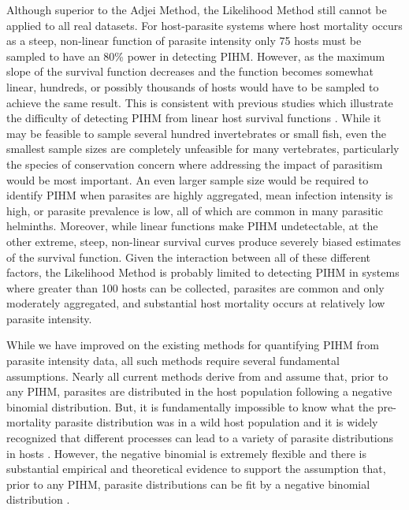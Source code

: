 \documentclass[12pt, a4paper]{article}
\begin{document}
Although superior to the Adjei Method, the Likelihood Method still cannot be applied to all real datasets. For host-parasite systems where host mortality occurs as a steep, non-linear function of parasite intensity only 75 hosts must be sampled to have an 80\% power in detecting PIHM. However, as the maximum slope of the survival function decreases and the function becomes somewhat linear, hundreds, or possibly thousands of hosts would have to be sampled to achieve the same result. This is consistent with previous studies which illustrate the difficulty of detecting PIHM from linear host survival functions \citep{Lanciani1989}.  While it may be feasible to sample several hundred invertebrates or small fish, even the smallest sample sizes are completely
unfeasible for many vertebrates, particularly the species of conservation
concern where addressing the impact of parasitism would be most important. An
even larger sample size would be required to identify PIHM when parasites are highly aggregated, mean infection intensity is
high, or parasite prevalence is low, all of which are
common in many parasitic helminths. Moreover, while linear functions make PIHM undetectable, at the other extreme, steep,
non-linear survival curves produce severely biased estimates of the survival
function. Given the interaction between all of these different factors, the
Likelihood Method is probably limited to detecting PIHM in systems where greater than 100 hosts can be collected, parasites are
common and only moderately aggregated, and substantial host mortality occurs at relatively low parasite intensity.

While we have improved on the existing methods for quantifying
PIHM from parasite intensity data, all such methods require several
fundamental assumptions.  Nearly all current methods derive from \cite{Crofton1971a} \citep[but see][]{Ferguson2011} and assume that, prior to any PIHM, parasites are distributed in the host population following a
negative binomial distribution. But, it is fundamentally impossible to know
what the pre-mortality parasite distribution was in a wild host population and
it is widely recognized that different processes can lead to a variety of
parasite distributions in hosts \citep{Anderson1982a, Duerr2003}. However, the negative binomial is extremely
flexible and there is substantial empirical and theoretical evidence to support
the assumption that, prior to any PIHM, parasite distributions can be fit by a negative binomial distribution \citep{Shaw1995,Shaw1998,Wilson2002}.
\end{document}
